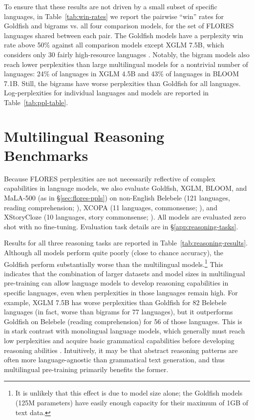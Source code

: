 \documentclass[11pt]{article}
\begin{document}
To ensure that these results are not driven by a small subset of specific languages, in Table~\ref{tab:win-rates} we report the pairwise ``win'' rates for Goldfish and bigrams vs. all four comparison models, for the set of FLORES languages shared between each pair.
The Goldfish models have a perplexity win rate above 50\% against all comparison models except XGLM 7.5B, which considers only 30 fairly high-resource languages \citep{lin2022xglm}.
Notably, the bigram models also reach lower perplexities than large multilingual models for a nontrivial number of languages: 24\% of languages in XGLM 4.5B and 43\% of languages in BLOOM 7.1B.
Still, the bigrams have worse perplexities than Goldfish for all languages.
Log-perplexities for individual languages and models are reported in Table~\ref{tab:ppl-table}.



\section{Multilingual Reasoning Benchmarks}
\label{sec:reasoning}
Because FLORES perplexities are not necessarily reflective of complex capabilities in language models, we also evaluate Goldfish, XGLM, BLOOM, and MaLA-500 (as in \S\ref{sec:flores-ppls}) on non-English Belebele (121 languages, reading comprehension; \citealp{bandarkar2024belebele}), XCOPA (11 languages, commonsense; 
\citealp{ponti-etal-2020-xcopa}), and XStoryCloze (10 languages, story commonsense; \citealp{lin2022xglm}).
All models are evaluated zero shot with no fine-tuning.
Evaluation task details are in \S\ref{app:reasoning-tasks}.

Results for all three reasoning tasks are reported in Table~\ref{tab:reasoning-results}.
Although all models perform quite poorly (close to chance accuracy), the Goldfish perform substantially worse than the multilingual models.\footnote{It is unlikely that this effect is due to model size alone; the Goldfish models (125M parameters) have easily enough capacity for their maximum of 1GB of text data.}
This indicates that the combination of larger datasets and model sizes in multilingual pre-training can allow language models to develop reasoning capabilities in specific languages, even when perplexities in those languages remain high.
For example, XGLM 7.5B has worse perplexities than Goldfish for 82 Belebele languages (in fact, worse than bigrams for 77 languages), but it outperforms Goldfish on Belebele (reading comprehension) for 56 of those languages.
This is in stark contrast with monolingual language models, which generally must reach low perplexities and acquire basic grammatical capabilities before developing reasoning abilities \citep{liu-etal-2021-probing-across,choshen-etal-2022-grammar,xia-etal-2023-training,chang2024characterizinglearningcurveslanguage}.
Intuitively, it may be that abstract reasoning patterns are often more language-agnostic than grammatical text generation, and thus multilingual pre-training primarily benefits the former.
\end{document}
